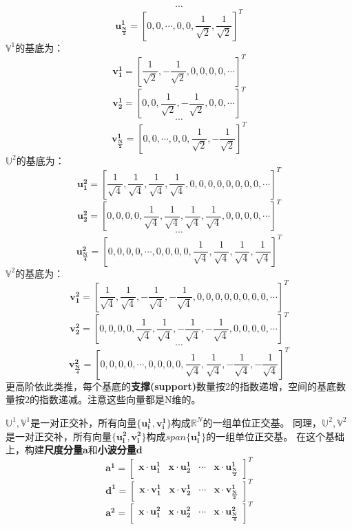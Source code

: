 \documentclass{article}
\begin{document}
\begin{CJK}{UTF8}{gbsn}
	$$\cdots$$
	$$\boldsymbol{u^1_{\frac{N}{2}}}=[0,0,\cdots,0,0,\frac{1}{\sqrt{2}},\frac{1}{\sqrt{2}}]^T$$
	$\mathbb{V}^1$的基底为：
	$$\boldsymbol{v^1_1}=[\frac{1}{\sqrt{2}},-\frac{1}{\sqrt{2}},0,0,0,0,\cdots]^T$$
    $$\boldsymbol{v^1_2}=[0,0,\frac{1}{\sqrt{2}},-\frac{1}{\sqrt{2}},0,0,\cdots]^T$$
    $$\cdots$$
    $$\boldsymbol{v^1_{\frac{N}{2}}}=[0,0,\cdots,0,0,\frac{1}{\sqrt{2}},-\frac{1}{\sqrt{2}}]^T$$
	$\mathbb{U}^2$的基底为：
    $$\boldsymbol{u^2_1}=[\frac{1}{\sqrt{4}},\frac{1}{\sqrt{4}},\frac{1}{\sqrt{4}},\frac{1}{\sqrt{4}},0,0,0,0,0,0,0,0,\cdots]^T$$
    $$\boldsymbol{u^2_2}=[0,0,0,0,\frac{1}{\sqrt{4}},\frac{1}{\sqrt{4}},\frac{1}{\sqrt{4}},\frac{1}{\sqrt{4}},0,0,0,0,\cdots]^T$$
    $$\cdots$$
    $$\boldsymbol{u^2_{\frac{N}{4}}}=[0,0,0,0,\cdots,0,0,0,0,\frac{1}{\sqrt{4}},\frac{1}{\sqrt{4}},\frac{1}{\sqrt{4}},\frac{1}{\sqrt{4}}]^T$$
	$\mathbb{V}^2$的基底为：
    $$\boldsymbol{v^2_1}=[\frac{1}{\sqrt{4}},\frac{1}{\sqrt{4}},-\frac{1}{\sqrt{4}},-\frac{1}{\sqrt{4}},0,0,0,0,0,0,0,0,\cdots]^T$$
    $$\boldsymbol{v^2_2}=[0,0,0,0,\frac{1}{\sqrt{4}},\frac{1}{\sqrt{4}},-\frac{1}{\sqrt{4}},-\frac{1}{\sqrt{4}},0,0,0,0,\cdots]^T$$
    $$\cdots$$
    $$\boldsymbol{v^2_{\frac{N}{4}}}=[0,0,0,0,\cdots,0,0,0,0,\frac{1}{\sqrt{4}},\frac{1}{\sqrt{4}},-\frac{1}{\sqrt{4}},-\frac{1}{\sqrt{4}}]^T$$
	更高阶依此类推，每个基底的\textbf{支撑(support)}数量按2的指数递增，空间的基底数量按2的指数递减。注意这些向量都是N维的。\par
	$\mathbb{U}^1,\mathbb{V}^1$是一对正交补，所有向量$\{\boldsymbol{u^1_i},\boldsymbol{v^1_i}\}$构成$\mathbb{R}^N$的一组单位正交基。
	同理，$\mathbb{U}^2,\mathbb{V}^2$是一对正交补，所有向量$\{\boldsymbol{u^2_i},\boldsymbol{v^2_i}\}$构成$span\{\boldsymbol{u^1_i}\}$的一组单位正交基。
	在这个基础上，构建\textbf{尺度分量}$\boldsymbol{a}$和\textbf{小波分量}$\boldsymbol{d}$
	$$\boldsymbol{a^1}=\begin{bmatrix}\boldsymbol{x}\cdot\boldsymbol{u^1_1}&\boldsymbol{x}\cdot\boldsymbol{u^1_2}&\cdots&\boldsymbol{x}\cdot\boldsymbol{u^1_{\frac{N}{2}}}\end{bmatrix}^T$$
	$$\boldsymbol{d^1}=\begin{bmatrix}\boldsymbol{x}\cdot\boldsymbol{v^1_1}&\boldsymbol{x}\cdot\boldsymbol{v^1_2}&\cdots&\boldsymbol{x}\cdot\boldsymbol{v^1_{\frac{N}{2}}}\end{bmatrix}^T$$
	$$\boldsymbol{a^2}=\begin{bmatrix}\boldsymbol{x}\cdot\boldsymbol{u^2_1}&\boldsymbol{x}\cdot\boldsymbol{u^2_2}&\cdots&\boldsymbol{x}\cdot\boldsymbol{u^2_{\frac{N}{4}}}\end{bmatrix}^T$$

\end{CJK}
\end{document}
